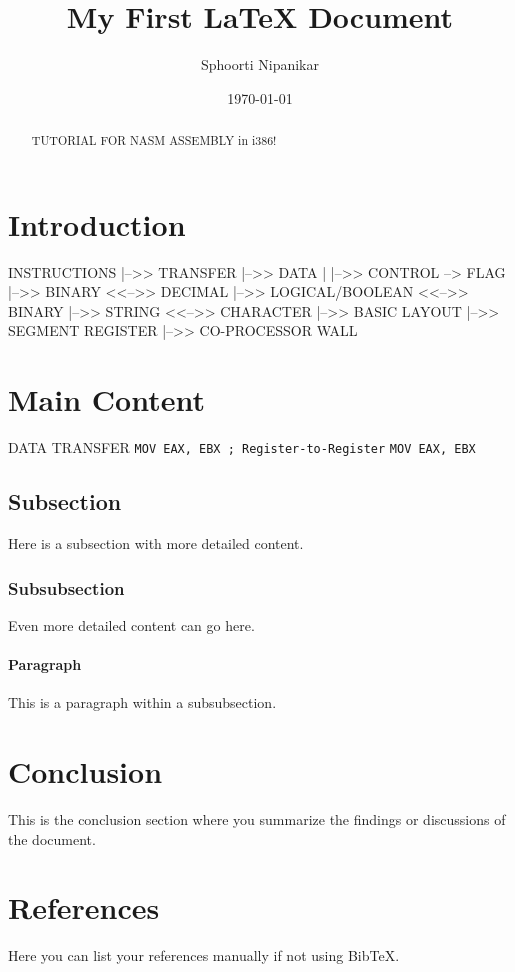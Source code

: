 \documentclass[a4paper,12pt]{article}
\title{My First LaTeX Document}
\author{Sphoorti Nipanikar}
\date{\today}                 %
\begin{document}
\maketitle

\begin{abstract}
TUTORIAL FOR NASM ASSEMBLY in i386!
\end{abstract}

\section{Introduction}
INSTRUCTIONS |-->> TRANSFER |-->> DATA
             |              |-->> CONTROL --> FLAG
             |-->> BINARY <<-->> DECIMAL
             |-->> LOGICAL/BOOLEAN <<-->> BINARY
             |-->> STRING <<-->> CHARACTER
             |-->> BASIC LAYOUT
             |-->> SEGMENT REGISTER
             |-->> CO-PROCESSOR WALL

\section{Main Content}
DATA TRANSFER 
\texttt{MOV EAX, EBX ; Register-to-Register}
\texttt{MOV EAX, EBX}
\subsection{Subsection}
Here is a subsection with more detailed content.

\subsubsection{Subsubsection}
Even more detailed content can go here.

\paragraph{Paragraph}
This is a paragraph within a subsubsection.

\section{Conclusion}
This is the conclusion section where you summarize the findings or discussions of the document.

\section*{References}
% 
% 

Here you can list your references manually if not using BibTeX.
\end{document}
